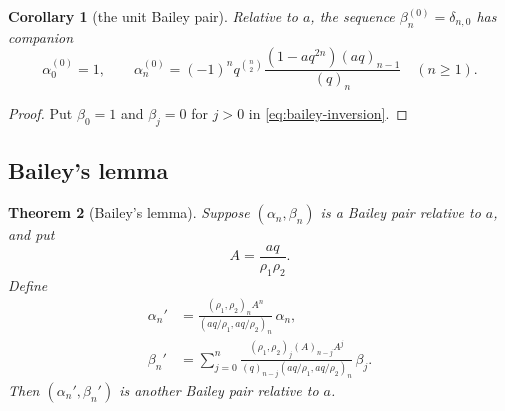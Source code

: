 \documentclass[11pt,oneside]{article}
\newtheorem{theorem}{Theorem}[section]
\newtheorem{corollary}[theorem]{Corollary}
\theoremstyle{definition}
\begin{document}
\begin{corollary}[the unit Bailey pair]\label{cor:unit-bailey}
Relative to $a$, the sequence $\beta_n^{(0)}=\delta_{n,0}$ has companion
\[
 \alpha_0^{(0)}=1,\qquad
 \alpha_n^{(0)}
 =(-1)^nq^{\binom n2}
 \frac{(1-aq^{2n})(aq)_{n-1}}{(q)_n}
 \quad(n\ge1).
\]
\end{corollary}

\begin{proof}
Put $\beta_0=1$ and $\beta_j=0$ for $j>0$ in
\eqref{eq:bailey-inversion}.
\end{proof}

\subsection{Bailey's lemma}

\begin{theorem}[Bailey's lemma]\label{thm:bailey-lemma}
Suppose $(\alpha_n,\beta_n)$ is a Bailey pair relative to $a$, and put
\[
 A=\frac{aq}{\rho_1\rho_2}.
\]
Define
\begin{align}
 \alpha_n'
 &=
 \frac{(\rho_1,\rho_2)_n A^n}
 {(aq/\rho_1,aq/\rho_2)_n}\,\alpha_n,
 \label{eq:bailey-alpha-prime}\\
 \beta_n'
 &=
 \sum_{j=0}^{n}
 \frac{(\rho_1,\rho_2)_j(A)_{n-j}A^j}
 {(q)_{n-j}(aq/\rho_1,aq/\rho_2)_n}\,\beta_j.
 \label{eq:bailey-beta-prime}
\end{align}
Then $(\alpha_n',\beta_n')$ is another Bailey pair relative to $a$.
\end{theorem}
\end{document}
